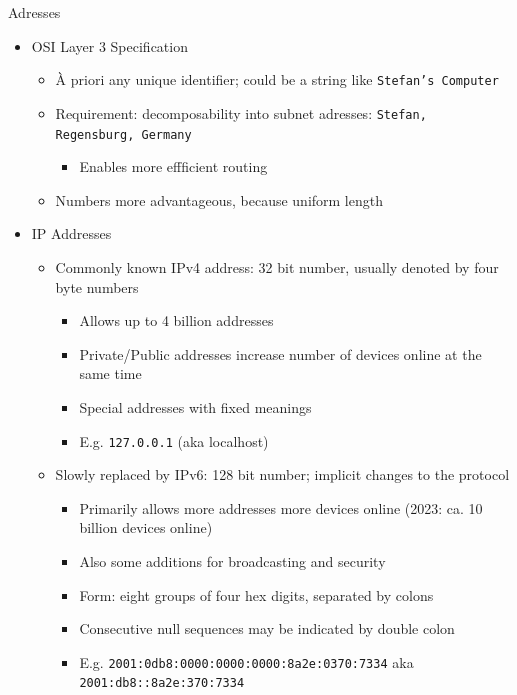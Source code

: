 \begin{frame}{Adresses}
%
\begin{itemize}
\item OSI Layer 3 Specification
	\begin{itemize}
	\item À priori any unique identifier; could be a string like \texttt{Stefan's Computer}
	\item Requirement: decomposability into subnet adresses: \texttt{Stefan, Regensburg, Germany}
		\begin{itemize}
		\item[\Thus] Enables more effficient routing 
		\end{itemize}
	\item Numbers more advantageous, because uniform length
	\pause
	\end{itemize}
\item IP Addresses
	\begin{itemize}
	\item Commonly known IPv4 address: 32 bit number, usually denoted by four byte numbers
		\begin{itemize}
		\item Allows up to 4 billion addresses
		\item Private/Public addresses increase number of devices online at the same time
		\item Special addresses with fixed meanings
		\item E.\;g. \texttt{127.0.0.1} (aka localhost)
		\end{itemize}
	\pause
	\item Slowly replaced by IPv6: 128 bit number; implicit changes to the protocol
		\begin{itemize}
		\item Primarily allows more addresses \Thus more devices online (2023: ca. 10 billion devices online)
		\item Also some additions for broadcasting and security
		\item Form: eight groups of four hex digits, separated by colons
		\item Consecutive null sequences may be indicated by double colon
		\item E.\;g. \texttt{2001:0db8:{\color{blue}0000:0000:0000}:8a2e:0370:7334} aka \texttt{2001:db8{\color{blue}::}8a2e:370:7334}
		\end{itemize}
	\end{itemize}
\end{itemize}
%
\end{frame}

